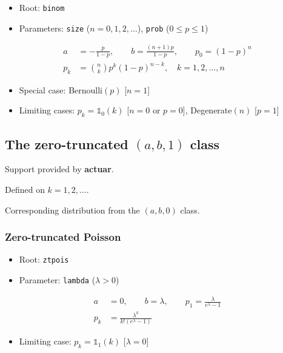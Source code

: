 \documentclass[x11names]{article}
\newcommand{\pkg}[1]{\textbf{#1}}
\newcommand{\code}[1]{\texttt{#1}}
\begin{document}
\begin{itemize}
\item Root: \code{binom}
\item Parameters: \code{size} ($n = 0, 1, 2, \dots$),
  \code{prob} ($0 \leq p \leq 1$)
\end{itemize}
\begin{align*}
  a &= -\frac{p}{1 - p}, \qquad b = \frac{(n + 1)p}{1 - p}, \qquad p_0 = (1 - p)^n \\
  p_k &= \binom{n}{k} p^k (1 - p)^{n - k}, \quad
        k = 1, 2, \dots, n
\end{align*}

\begin{itemize}
\item Special case: Bernoulli$(p)$ [$n = 1$]
\item Limiting cases: $p_k = \mathbb{1}_0(k)$ [$n = 0$ or $p = 0$],
  Degenerate$(n)$ [$p = 1$]
\end{itemize}


\subsection[The zero-truncated (a, b, 0) class]{The zero-truncated $(a, b, 1)$ class}
\label{sec:app:discrete:zt}

Support provided by \pkg{actuar}.

Defined on $k = 1, 2, \dots$.

Corresponding distribution from the $(a, b, 0)$ class.

\subsubsection{Zero-truncated Poisson}

\begin{itemize}
\item Root: \code{ztpois}
\item Parameter: \code{lambda} ($\lambda > 0$)
\end{itemize}
\begin{align*}
  a &= 0, \qquad b = \lambda, \qquad
      p_1 = \frac{\lambda}{e^\lambda - 1} \\
  p_k &= \frac{\lambda^k}{k! (e^\lambda - 1)}
\end{align*}

\begin{itemize}
\item Limiting case: $p_k = \mathbb{1}_1(k)$ [$\lambda = 0$]
\end{itemize}
\end{document}
